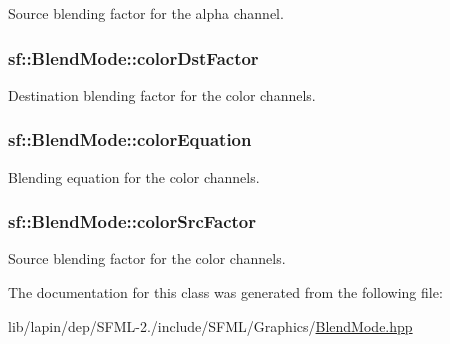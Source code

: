 Source blending factor for the alpha channel. 

\hypertarget{structsf_1_1_blend_mode_adee68ee59e7f1bf71d12db03d251104d}{
\subsubsection[{color\-Dst\-Factor}]{ sf\-::\-Blend\-Mode\-::color\-Dst\-Factor}}\label{structsf_1_1_blend_mode_adee68ee59e7f1bf71d12db03d251104d}


Destination blending factor for the color channels. 

\hypertarget{structsf_1_1_blend_mode_aed12f06eb7f50a1b95b892b0964857b1}{
\subsubsection[{color\-Equation}]{ sf\-::\-Blend\-Mode\-::color\-Equation}}\label{structsf_1_1_blend_mode_aed12f06eb7f50a1b95b892b0964857b1}


Blending equation for the color channels. 

\hypertarget{structsf_1_1_blend_mode_a32d1a55dbfada86a06d9b881dc8ccf7b}{
\subsubsection[{color\-Src\-Factor}]{ sf\-::\-Blend\-Mode\-::color\-Src\-Factor}}\label{structsf_1_1_blend_mode_a32d1a55dbfada86a06d9b881dc8ccf7b}


Source blending factor for the color channels. 



The documentation for this class was generated from the following file\-:\begin{DoxyCompactItemize}
\item 
lib/lapin/dep/\-S\-F\-M\-L-\/2./include/\-S\-F\-M\-L/\-Graphics/\hyperlink{lapin_2dep_2_s_f_m_l-2_83_2include_2_s_f_m_l_2_graphics_2_blend_mode_8hpp}{Blend\-Mode.\-hpp}\end{DoxyCompactItemize}
